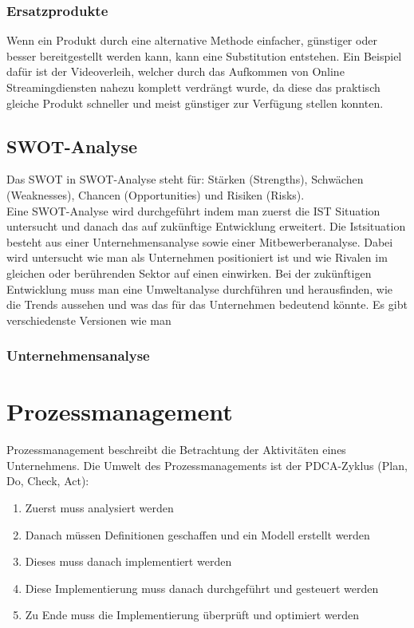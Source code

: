 \documentclass{article}
\begin{document}
  \subsubsection{Ersatzprodukte}
  Wenn ein Produkt durch eine alternative Methode einfacher, günstiger oder besser bereitgestellt werden kann, kann eine Substitution entstehen. Ein Beispiel dafür ist der Videoverleih, welcher durch das Aufkommen von Online Streamingdiensten nahezu komplett verdrängt wurde, da diese das praktisch gleiche Produkt schneller und meist günstiger zur Verfügung stellen konnten.
  \subsection{SWOT-Analyse}
  Das SWOT in SWOT-Analyse steht für: Stärken (Strengths), Schwächen (Weaknesses), Chancen (Opportunities) und Risiken (Risks). \\
  Eine SWOT-Analyse wird durchgeführt indem man zuerst die IST Situation untersucht und danach das auf zukünftige Entwicklung erweitert. Die Istsituation besteht aus einer Unternehmensanalyse sowie einer Mitbewerberanalyse. Dabei wird untersucht wie man als Unternehmen positioniert ist und wie Rivalen im gleichen oder berührenden Sektor auf einen einwirken. Bei der zukünftigen Entwicklung muss man eine Umweltanalyse durchführen und herausfinden, wie die Trends aussehen und was das für das Unternehmen bedeutend könnte. Es gibt verschiedenste Versionen wie man
  \subsubsection{Unternehmensanalyse}
  \section{Prozessmanagement}
  Prozessmanagement beschreibt die Betrachtung der Aktivitäten eines Unternehmens. Die Umwelt des Prozessmanagements ist der PDCA-Zyklus (Plan, Do, Check, Act):
  \begin{enumerate}
    \item{Zuerst muss analysiert werden}
    \item{Danach müssen Definitionen geschaffen und ein Modell erstellt werden}
    \item{Dieses muss danach implementiert werden}
    \item{Diese Implementierung muss danach durchgeführt und gesteuert werden}
    \item{Zu Ende muss die Implementierung überprüft und optimiert werden}
  \end{enumerate}
\end{document}
